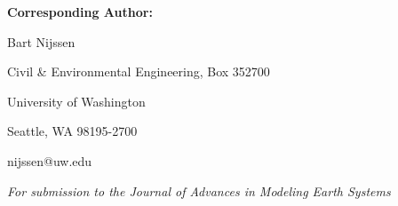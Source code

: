 \textbf{Corresponding Author: }

Bart Nijssen

Civil & Environmental Engineering, Box 352700

University of Washington

Seattle, WA 98195-2700

nijssen@uw.edu

\centerline{\textit{For submission to the Journal of Advances in Modeling Earth Systems}}

\pagebreak
  
  
  
  
  